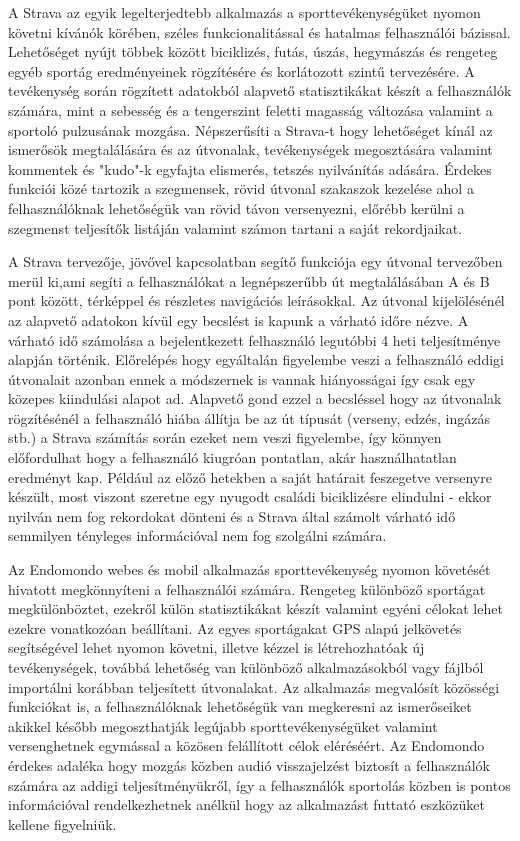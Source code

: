 A Strava \cite{strava} az egyik legelterjedtebb alkalmazás a sporttevékenységüket nyomon követni kívánók körében, széles funkcionalitással és hatalmas felhasználói bázissal. Lehetőséget nyújt többek között biciklizés, futás, úszás, hegymászás és rengeteg egyéb sportág eredményeinek rögzítésére és korlátozott szintű tervezésére. A tevékenység során rögzített adatokból alapvető statisztikákat készít a felhasználók számára, mint a sebesség és a tengerszint feletti magasság változása valamint a sportoló pulzusának mozgása. Népszerűsíti a Strava-t hogy lehetőséget kínál az ismerősök megtalálására és az útvonalak, tevékenységek megosztására valamint kommentek és "kudo"-k egyfajta elismerés, tetszés nyilvánítás adására. Érdekes funkciói közé tartozik a szegmensek, rövid útvonal szakaszok kezelése ahol a felhasználóknak lehetőségük van rövid távon versenyezni, előrébb kerülni a szegmenst teljesítők listáján valamint számon tartani a saját rekordjaikat. 

A Strava tervezője, jövővel kapcsolatban segítő funkciója egy útvonal tervezőben merül ki,ami segíti a felhasználókat a legnépszerűbb út megtalálásában A és B pont között, térképpel és részletes navigációs leírásokkal. Az útvonal kijelölésénél az alapvető adatokon kívül egy becslést is kapunk a várható időre nézve. A várható idő számolása a bejelentkezett felhasználó legutóbbi 4 heti teljesítménye alapján történik. Előrelépés hogy egyáltalán figyelembe veszi a felhasználó eddigi útvonalait azonban ennek a módszernek is vannak hiányosságai így csak egy közepes kiindulási alapot ad. Alapvető gond ezzel a becsléssel hogy az útvonalak rögzítésénél a felhasználó hiába állítja be az út típusát (verseny, edzés, ingázás stb.) a Strava számítás során ezeket nem veszi figyelembe, így könnyen előfordulhat hogy a felhasználó kiugróan pontatlan, akár használhatatlan eredményt kap. Például az előző hetekben a saját határait feszegetve versenyre készült, most viszont szeretne egy nyugodt családi biciklizésre elindulni - ekkor nyilván nem fog rekordokat dönteni és a Strava által számolt várható idő semmilyen tényleges információval nem fog szolgálni számára.


Az Endomondo \cite{endomondo} webes és mobil alkalmazás sporttevékenység nyomon követését hivatott megkönnyíteni a felhasználói számára. Rengeteg különböző sportágat megkülönböztet, ezekről külön statisztikákat készít valamint egyéni célokat lehet ezekre vonatkozóan beállítani. Az egyes sportágakat GPS alapú jelkövetés segítségével lehet nyomon követni, illetve kézzel is létrehozhatóak új tevékenységek, továbbá lehetőség van különböző alkalmazásokból vagy fájlból importálni korábban teljesített útvonalakat. Az alkalmazás megvalósít közösségi funkciókat is, a felhasználóknak lehetőségük van megkeresni az ismerőseiket akikkel később megoszthatják legújabb sporttevékenységüket valamint versenghetnek egymással a közösen felállított célok eléréséért. Az Endomondo érdekes adaléka hogy mozgás közben audió visszajelzést biztosít a felhasználók számára az addigi teljesítményükről, így a felhasználók sportolás közben is pontos információval rendelkezhetnek anélkül hogy az alkalmazást futtató eszközüket kellene figyelniük.



